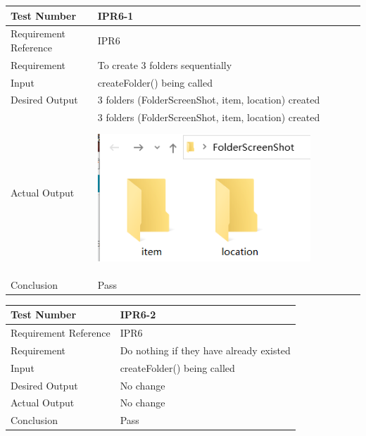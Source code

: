 \documentclass[12pt, titlepage]{article}
\begin{document}
\begin{table}[H]
\begin{center}
\begin{tabular}{|l | m{9cm}|}
\hline
  Test Number & IPR6-1\\
  \hline
  Requirement Reference & IPR6\\
  \hline
  Requirement &  To create 3 folders sequentially\\
  \hline
  Input & createFolder() being called\\
  \hline
  Desired Output & 3 folders (FolderScreenShot, item, location) created\\
  \hline
  Actual Output & 3 folders (FolderScreenShot, item, location) created\includegraphics[width=80mm, height=55mm]{UT1.png}\\
  \hline
  Conclusion & Pass\\
  \hline
\end{tabular}
\end{center}           
\end{table}
\begin{table}[H]
\begin{center}
\begin{tabular}{|l | m{9cm}|}
\hline
  Test Number & IPR6-2\\
  \hline
  Requirement Reference & IPR6\\
  \hline
  Requirement &  Do nothing if they have already existed\\
  \hline
  Input & createFolder() being called\\
  \hline
  Desired Output & No change\\
  \hline
  Actual Output & No change\\
  \hline
  Conclusion & Pass\\
  \hline
\end{tabular}
\end{center}           
\end{table}
\end{document}
